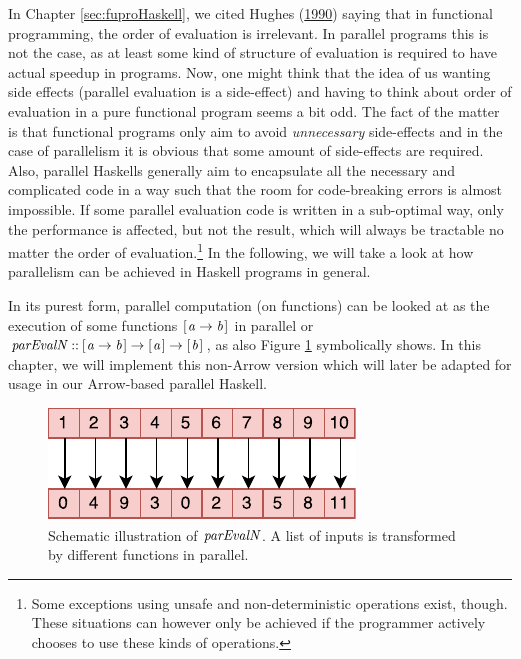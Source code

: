 \documentclass[paper=A4,twoside=true,openright,parskip=full,chapterprefix=true,headings=normal,bibliography=totoc,listof=totoc,titlepage=on,captions=tableabove,draft=false,british]{scrreprt}%
\begin{document}
\label{sec:parallelHaskells} \label{sec:parEvalNIntro}

In Chapter \ref{sec:fuproHaskell}, we cited Hughes
(\protect\hyperlink{ref-Hughes:1990:WFP:119830.119832}{1990}) saying
that in functional programming, the order of evaluation is irrelevant.
In parallel programs this is not the case, as at least some kind of
structure of evaluation is required to have actual speedup in programs.
Now, one might think that the idea of us wanting side effects (parallel
evaluation is a side-effect) and having to think about order of
evaluation in a pure functional program seems a bit odd. The fact of the
matter is that functional programs only aim to avoid \emph{unnecessary}
side-effects and in the case of parallelism it is obvious that some
amount of side-effects are required. Also, parallel Haskells generally
aim to encapsulate all the necessary and complicated code in a way such
that the room for code-breaking errors is almost impossible. If some
parallel evaluation code is written in a sub-optimal way, only the
performance is affected, but not the result, which will always be
tractable no matter the order of evaluation.\footnote{Some exceptions
  using unsafe and non-deterministic operations exist, though. These
  situations can however only be achieved if the programmer actively
  chooses to use these kinds of operations.} In the following, we will
take a look at how parallelism can be achieved in Haskell programs in
general.

In its purest form, parallel computation (on functions) can be looked at
as the execution of some functions \ensuremath{[\mskip1.5mu \Varid{a}\to \Varid{b}\mskip1.5mu]} in parallel or
\ensuremath{\Varid{parEvalN}\mathbin{::}[\mskip1.5mu \Varid{a}\to \Varid{b}\mskip1.5mu]\to [\mskip1.5mu \Varid{a}\mskip1.5mu]\to [\mskip1.5mu \Varid{b}\mskip1.5mu]}, as also Figure \ref{fig:parEvalN}
symbolically shows. In this chapter, we will implement this non-Arrow
version which will later be adapted for usage in our Arrow-based
parallel Haskell.

\begin{figure}
\centering
\includegraphics{src/img/parEvalN.pdf}
\caption[Schematic illustration of \ensuremath{\Varid{parEvalN}}.]{Schematic illustration of \ensuremath{\Varid{parEvalN}}. A list of inputs is
transformed by different functions in parallel.\label{fig:parEvalN}}
\end{figure}
\end{document}

